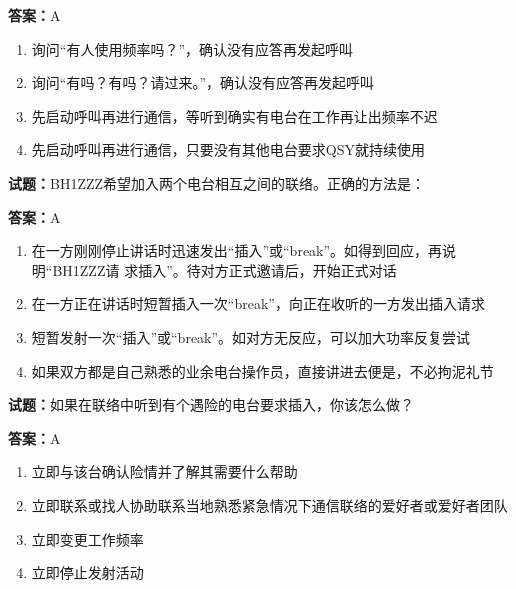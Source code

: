 \documentclass{ctexbook}
\begin{document}
\textbf{答案：}A 

\begin{enumerate}[leftmargin=3em]
  \item 询问“有人使用频率吗？”，确认没有应答再发起呼叫 

  \item 询问“有吗？有吗？请过来。”，确认没有应答再发起呼叫 

  \item 先启动呼叫再进行通信，等听到确实有电台在工作再让出频率不迟 

  \item 先启动呼叫再进行通信，只要没有其他电台要求QSY就持续使用 

\end{enumerate}





\vspace{1em}

\textbf{试题：}BH1ZZZ希望加入两个电台相互之间的联络。正确的方法是： 

\textbf{答案：}A 

\begin{enumerate}[leftmargin=3em]
  \item 在一方刚刚停止讲话时迅速发出“插入”或“break”。如得到回应，再说明“BH1ZZZ请
求插入”。待对方正式邀请后，开始正式对话 

  \item 在一方正在讲话时短暂插入一次“break”，向正在收听的一方发出插入请求 

  \item 短暂发射一次“插入”或“break”。如对方无反应，可以加大功率反复尝试 

  \item 如果双方都是自己熟悉的业余电台操作员，直接讲进去便是，不必拘泥礼节 

\end{enumerate}





\vspace{1em}

\textbf{试题：}如果在联络中听到有个遇险的电台要求插入，你该怎么做？ 

\textbf{答案：}A 

\begin{enumerate}[leftmargin=3em]
  \item 立即与该台确认险情并了解其需要什么帮助 

  \item 立即联系或找人协助联系当地熟悉紧急情况下通信联络的爱好者或爱好者团队 

  \item 立即变更工作频率 

  \item 立即停止发射活动 

\end{enumerate}
\end{document}
